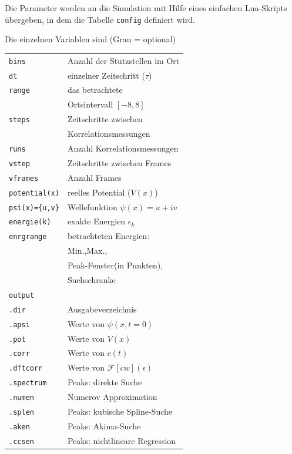 \documentclass[10pt,a4paper,german]{scrartcl}
\begin{document}
  			Die Parameter werden an die Simulation mit Hilfe eines einfachen
	  		Lua-Skripts übergeben, in dem die Tabelle 
		  	\lstinline!config! definiert wird.
			  
  			Die einzelnen Variablen sind (Grau = optional)
			
	  		\begin{tabular}{ll}
		  		\lstinline!bins! & Anzahl der Stützstellen im Ort\\
			  	\lstinline!dt!   & einzelner Zeitschritt ($\tau$)\\
				  \lstinline!range!& das betrachtete \\
	  			                 & Ortsintervall $[-8,8]$\\
  				\lstinline!steps!& Zeitschritte zwischen \\
		  		                 & Korrelationsmessungen\\
			  	\lstinline!runs!& Anzahl Korrelationsmessungen\\
				  \rowcolor{lightgray}
  				\lstinline!vstep!& Zeitschritte zwischen Frames\\
	  			\rowcolor{lightgray}
		  		\lstinline!vframes!& Anzahl Frames\\
			  	\lstinline!potential(x)!& reelles Potential ($V(x)$)\\
				  \lstinline!psi(x)={u,v}!& Wellefunktion $\psi(x)=u+i v$\\
  				\rowcolor{lightgray}
	  			\lstinline!energie(k)!& exakte Energien $\epsilon_k$\\
		  		\lstinline!enrgrange!& betrachteten Energien:\\
          				 & Min.,Max.,\\
				           & Peak-Fenster(in Punkten),\\
				           & Suchschranke\\
  				\lstinline!output!& \\
	  			\lstinline!.dir!& Ausgabeverzeichnis\\
		  		\rowcolor{lightgray}
			  	\lstinline!.apsi!& Werte von $\psi(x,t=0)$\\
				  \rowcolor{lightgray}
  				\lstinline!.pot!& Werte von $V(x)$\\
	  			\rowcolor{lightgray}
		  		\lstinline!.corr!& Werte von $c(t)$\\
			  	\rowcolor{lightgray}
  				\lstinline!.dftcorr!& Werte von $\mathcal{F}[cw](\epsilon)$ \\
	  			\rowcolor{lightgray}
		  		\lstinline!.spectrum!& Peaks: direkte Suche \\
			  	\rowcolor{lightgray}
				  \lstinline!.numen!& Numerov Approximation \\
  				\rowcolor{lightgray}
	  			\lstinline!.splen!& Peaks: kubische Spline-Suche \\
		  		\rowcolor{lightgray}
			  	\lstinline!.aken!& Peaks: Akima-Suche \\
				  \rowcolor{lightgray}
  				\lstinline!.ccsen!& Peaks: nichtlineare Regression \\
	  		\end{tabular}
  
\end{document}

